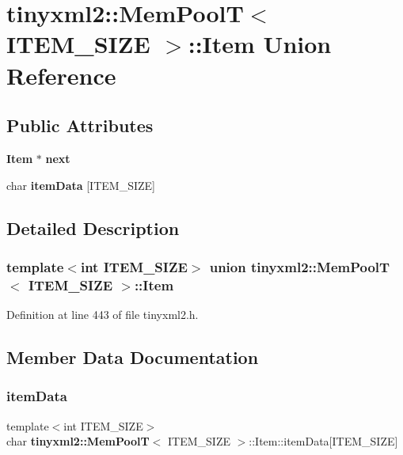 \section{tinyxml2\+::Mem\+PoolT$<$ I\+T\+E\+M\+\_\+\+S\+I\+ZE $>$\+::Item Union Reference}
\label{uniontinyxml2_1_1_mem_pool_t_1_1_item}
\subsection*{Public Attributes}
\begin{DoxyCompactItemize}
\item 
\textbf{ Item} $\ast$ \textbf{ next}
\item 
char \textbf{ item\+Data} [I\+T\+E\+M\+\_\+\+S\+I\+ZE]
\end{DoxyCompactItemize}


\subsection{Detailed Description}
\subsubsection*{template$<$int I\+T\+E\+M\+\_\+\+S\+I\+ZE$>$\newline
union tinyxml2\+::\+Mem\+Pool\+T$<$ I\+T\+E\+M\+\_\+\+S\+I\+Z\+E $>$\+::\+Item}



Definition at line 443 of file tinyxml2.\+h.



\subsection{Member Data Documentation}
\mbox{\label{uniontinyxml2_1_1_mem_pool_t_1_1_item_aff63ccc8d7b05035820b83e1f0fa8037}} 
\subsubsection{itemData}
{\footnotesize\ttfamily template$<$int I\+T\+E\+M\+\_\+\+S\+I\+ZE$>$ \\
char \textbf{ tinyxml2\+::\+Mem\+PoolT}$<$ I\+T\+E\+M\+\_\+\+S\+I\+ZE $>$\+::Item\+::item\+Data[I\+T\+E\+M\+\_\+\+S\+I\+ZE]}



